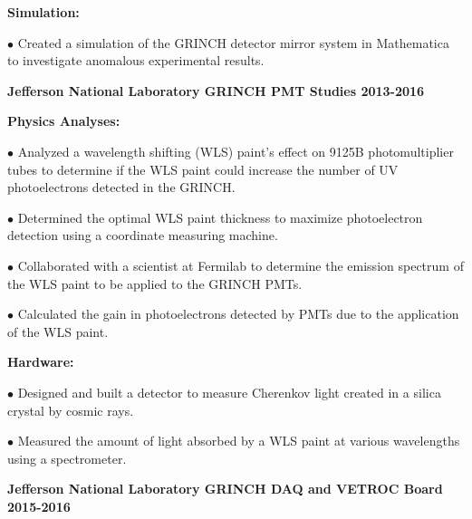 \documentclass[letterpaper,10pt]{article}
\renewenvironment{itemize}{
  \begin{list}{}{
    \setlength{\leftmargin}{1.5em}
  }
}{
  \end{list}
}
\begin{document}
{\begin{itemize}
\begin{itemize}
   \item \textbf{Simulation:}
     \begin{itemize}\itemsep5pt \parskip0pt 
      \item $\bullet$ Created a simulation of the GRINCH detector mirror system in Mathematica to investigate anomalous experimental results.
     \end{itemize} 
 
\end{itemize}

\item {\large {\bf Jefferson National Laboratory GRINCH PMT Studies 2013-2016} }

 \begin{itemize}\itemsep5pt \parskip0pt 
  \item \textbf{Physics Analyses:}
   
    \begin{itemize}\itemsep5pt \parskip0pt 
     \item $\bullet$ Analyzed a wavelength shifting (WLS) paint's effect on 9125B photomultiplier tubes to determine if the WLS paint could increase the number of UV photoelectrons detected in the GRINCH. 
     \item $\bullet$ Determined the optimal WLS paint thickness to maximize photoelectron detection using a coordinate measuring machine.
     \item $\bullet$ Collaborated with a scientist at Fermilab to determine the emission spectrum of the WLS paint to be applied to the GRINCH PMTs.
     \item $\bullet$ Calculated the gain in photoelectrons detected by PMTs due to the application of the WLS paint. 
     \end{itemize}

  \item \textbf{Hardware:}
    \begin{itemize}\itemsep5pt \parskip0pt 
     \item $\bullet$ Designed and built a detector to measure Cherenkov light created in a silica crystal by cosmic rays. 
     \item $\bullet$ Measured the amount of light absorbed by a WLS paint at various wavelengths using a spectrometer. 
    \end{itemize}
 \end{itemize}
 
\item {\large {\bf Jefferson National Laboratory GRINCH DAQ and VETROC Board 2015-2016} }


\end{itemize}}
\end{document}
